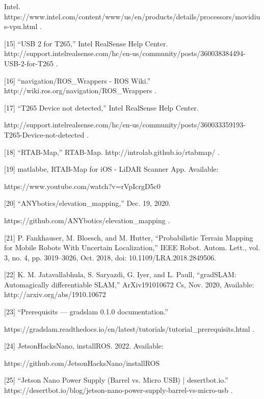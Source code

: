 \documentclass{article}
\begin{document}
Intel. https://www.intel.com/content/www/us/en/products/details/processors/movidius-vpu.html .
\bigskip

[15]	“USB 2 for T265,” Intel RealSense Help Center. http://support.intelrealsense.com/hc/en-us/community/posts/360038384494-USB-2-for-T265 .
\bigskip

[16]	“navigation/ROS\_Wrappers - ROS Wiki.” http://wiki.ros.org/navigation/ROS\_Wrappers .
\bigskip

[17]	“T265 Device not detected,” Intel RealSense Help Center.

http://support.intelrealsense.com/hc/en-us/community/posts/360033359193-T265-Device-not-detected .
\bigskip

[18]	“RTAB-Map,” RTAB-Map. http://introlab.github.io/rtabmap/ .
\bigskip

[19]	matlabbe, RTAB-Map for iOS - LiDAR Scanner App. Available:

https://www.youtube.com/watch?v=rVpIcrgD5c0
\bigskip

[20]	“ANYbotics/elevation\_mapping,” Dec. 19, 2020.

https://github.com/ANYbotics/elevation\_mapping .
\bigskip

[21]	P. Fankhauser, M. Bloesch, and M. Hutter, “Probabilistic Terrain Mapping for Mobile Robots With Uncertain Localization,” IEEE Robot. Autom. Lett., vol. 3, no. 4, pp. 3019–3026, Oct. 2018, doi: 10.1109/LRA.2018.2849506.
\bigskip

[22]	K. M. Jatavallabhula, S. Saryazdi, G. Iyer, and L. Paull, “gradSLAM: Automagically differentiable SLAM,” ArXiv191010672 Cs, Nov. 2020, Available: http://arxiv.org/abs/1910.10672
\bigskip

[23]	“Prerequisits — gradslam 0.1.0 documentation.”

https://gradslam.readthedocs.io/en/latest/tutorials/tutorial\_prerequisits.html .
\bigskip

[24]	JetsonHacksNano, installROS. 2022. Available: 

https://github.com/JetsonHacksNano/installROS
\bigskip

[25]	“Jetson Nano Power Supply (Barrel vs. Micro USB) | desertbot.io.” https://desertbot.io/blog/jetson-nano-power-supply-barrel-vs-micro-usb .
\bigskip
\end{document}
